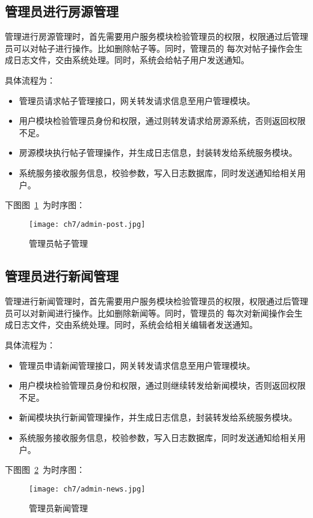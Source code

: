 \subsection{管理员进行房源管理}
管理进行房源管理时，首先需要用户服务模块检验管理员的权限，权限通过后管理员可以对帖子进行操作。比如删除帖子等。同时，管理员的
每次对帖子操作会生成日志文件，交由系统处理。同时，系统会给帖子用户发送通知。

具体流程为：
\begin{itemize}
    \item 管理员请求帖子管理接口，网关转发请求信息至用户管理模块。
    \item 用户模块检验管理员身份和权限，通过则转发请求给房源系统，否则返回权限不足。
    \item 房源模块执行帖子管理操作，并生成日志信息，封装转发给系统服务模块。
    \item 系统服务接收服务信息，校验参数，写入日志数据库，同时发送通知给相关用户。
\end{itemize}

下图图~\ref{fig:admin-post}~为时序图：
\begin{figure}[htbp]
    \centering
    \texttt{[image: ch7/admin-post.jpg]}
    \caption{管理员帖子管理}\label{fig:admin-post}
    \vspace{\baselineskip} %
\end{figure}

\subsection{管理员进行新闻管理}
管理进行新闻管理时，首先需要用户服务模块检验管理员的权限，权限通过后管理员可以对新闻进行操作。比如删除新闻等。同时，管理员的
每次对新闻操作会生成日志文件，交由系统处理。同时，系统会给相关编辑者发送通知。

具体流程为：
\begin{itemize}
    \item 管理员申请新闻管理接口，网关转发请求信息至用户管理模块。
    \item 用户模块检验管理员身份和权限，通过则继续转发给新闻模块，否则返回权限不足。
    \item 新闻模块执行新闻管理操作，并生成日志信息，封装转发给系统服务模块。
    \item 系统服务接收服务信息，校验参数，写入日志数据库，同时发送通知给相关用户。
\end{itemize}

下图图~\ref{fig:admin-news}~为时序图：
\begin{figure}[htbp]
    \centering
    \texttt{[image: ch7/admin-news.jpg]}
    \caption{管理员新闻管理}\label{fig:admin-news}
    \vspace{\baselineskip} %
\end{figure}

